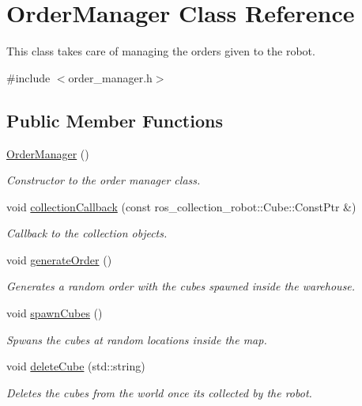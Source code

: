 \hypertarget{class_order_manager}{}\section{Order\+Manager Class Reference}
\label{class_order_manager}


This class takes care of managing the orders given to the robot.  




{\ttfamily \#include $<$order\+\_\+manager.\+h$>$}

\subsection*{Public Member Functions}
\begin{DoxyCompactItemize}
\item 
\hyperlink{class_order_manager_a77db3965911e31246416250711899633}{Order\+Manager} ()
\begin{DoxyCompactList}\small\item\em Constructor to the order manager class. \end{DoxyCompactList}\item 
void \hyperlink{class_order_manager_a13daaebc0fb01ad6da98386c8888633a}{collection\+Callback} (const ros\+\_\+collection\+\_\+robot\+::\+Cube\+::\+Const\+Ptr \&)
\begin{DoxyCompactList}\small\item\em Callback to the collection objects. \end{DoxyCompactList}\item 
void \hyperlink{class_order_manager_ace7dbb29e033a5e381d50f0d302243c1}{generate\+Order} ()
\begin{DoxyCompactList}\small\item\em Generates a random order with the cubes spawned inside the warehouse. \end{DoxyCompactList}\item 
void \hyperlink{class_order_manager_a0e643b3d4d311537d3f04d2c66661576}{spawn\+Cubes} ()
\begin{DoxyCompactList}\small\item\em Spwans the cubes at random locations inside the map. \end{DoxyCompactList}\item 
void \hyperlink{class_order_manager_af6abc7332447e88fe60c87f1f7e57add}{delete\+Cube} (std\+::string)
\begin{DoxyCompactList}\small\item\em Deletes the cubes from the world once its collected by the robot. \end{DoxyCompactList}\item 

\end{DoxyCompactItemize}
